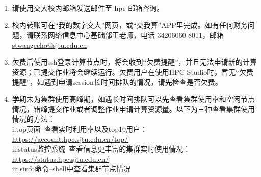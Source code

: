 \documentclass[cn, 12pt, hang, black, chinese]{elegantbook}
\begin{document}
\begin{enumerate}[itemsep=1.3ex]
  \item {}
    请使用交大校内邮箱发送邮件至 hpc 邮箱咨询。
  \item {}
    校内转账可在“我的数字交大”网页，或“交我算”APP里完成。如有任何财务问题，请联系网络信息中心基础部王老师，电话 34206060-8011，邮箱 \href{mailto:stwangecho@sjtu.edu.cn}{stwangecho@sjtu.edu.cn}
  \item {}
    欠费后使用ssh登录计算节点时，将会收到“欠费提醒”，并且无法申请新的计算资源；已提交作业将会继续运行。欠费用户在使用HPC Studio时，暂无“欠费提醒”，如遇到申请session长时间排队的情况，请先检查是否欠费。
  \item {}
    学期末为集群使用高峰期，如遇长时间排队可以先查看集群使用率和空闲节点情况，错峰提交作业或者调整作业申请计算资源量。以下为三种查看集群使用情况的方法：\\i.top页面--查看实时利用率以及top10用户：\href{https://account.hpc.sjtu.edu.cn/top/}{https://account.hpc.sjtu.edu.cn/top/}\\ii.status监控系统--查看信息更丰富的集群实时使用情况：\href{https://status.hpc.sjtu.edu.cn/}{https://status.hpc.sjtu.edu.cn/}\\iii.sinfo命令--shell中查看集群节点情况
\end{enumerate}
\end{document}

